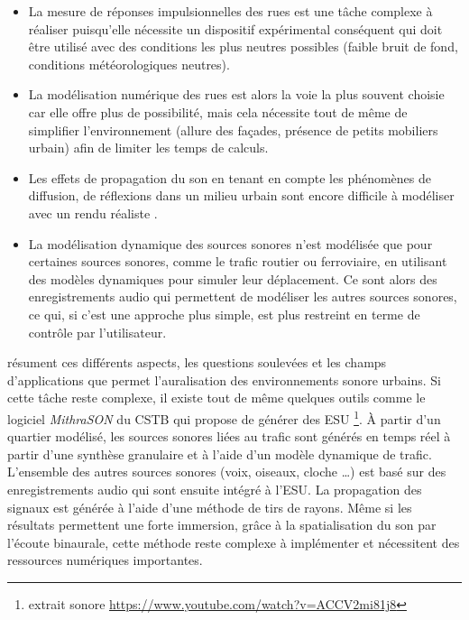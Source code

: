 \begin{itemize}
\item La mesure de réponses impulsionnelles des rues \cite{picaut2005experimental} est une tâche complexe à réaliser puisqu'elle nécessite un dispositif expérimental conséquent qui doit être utilisé avec des conditions les plus neutres possibles (faible bruit de fond, conditions météorologiques neutres).
\item La modélisation numérique des rues est alors la voie la plus souvent choisie car elle offre plus de possibilité, mais cela nécessite tout de même de simplifier l'environnement (allure des façades, présence de petits mobiliers urbain) afin de limiter les temps de calculs.
\item Les effets de propagation du son en tenant en compte les phénomènes de diffusion, de réflexions dans un milieu urbain sont encore difficile à modéliser avec un rendu réaliste \cite{schissler2014high}.
\item La modélisation dynamique des sources sonores n'est modélisée que pour certaines sources sonores, comme le trafic routier ou ferroviaire, en utilisant des modèles dynamiques pour simuler leur déplacement. Ce sont alors des enregistrements audio qui permettent de modéliser les autres sources sonores, ce qui, si c'est une approche plus simple, est plus restreint en terme de contrôle par l'utilisateur. 
\end{itemize}

\cite{stienen2015auralization} résument ces différents aspects, les questions soulevées et les champs d'applications que permet l'auralisation des environnements sonore urbains.
Si cette tâche reste complexe, il existe tout de même quelques outils comme le logiciel \textit{MithraSON} du CSTB qui propose de générer des ESU \footnote{extrait sonore \url{https://www.youtube.com/watch?v=ACCV2mi81j8}}. À partir d'un quartier modélisé, les sources sonores liées au trafic sont générés en temps réel à partir d'une synthèse granulaire et à l'aide d'un modèle dynamique de trafic. L'ensemble des autres sources sonores (voix, oiseaux, cloche \dots) est basé sur des enregistrements audio qui sont ensuite intégré à l'ESU. La propagation des signaux est générée à l'aide d'une méthode de tirs de rayons.
Même si les résultats permettent une forte immersion, grâce à la spatialisation du son par l'écoute binaurale, cette méthode reste complexe à implémenter et nécessitent des ressources numériques importantes.

